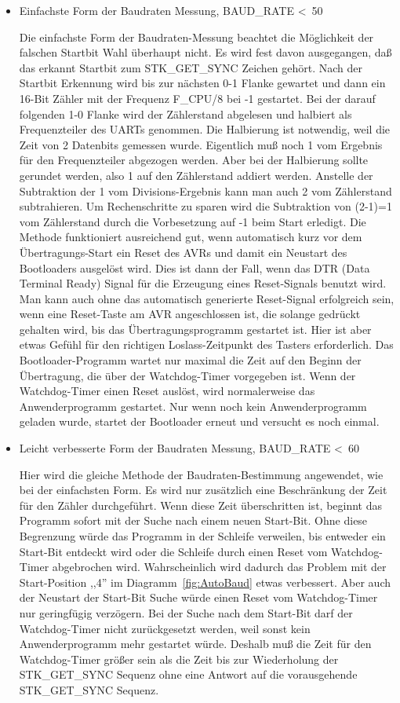 \begin{itemize}

\item {Einfachste Form der Baudraten Messung, BAUD\_RATE \textless~50}

Die einfachste Form der Baudraten-Messung beachtet die Möglichkeit der
falschen Startbit Wahl überhaupt nicht. Es wird fest davon ausgegangen,
daß das erkannt Startbit zum STK\_\-GET\_\-SYNC Zeichen gehört.
Nach der Startbit Erkennung wird bis zur nächsten 0-1 Flanke gewartet
und dann ein 16-Bit Zähler mit der Frequenz F\_CPU/8 bei -1 gestartet.
Bei der darauf folgenden 1-0 Flanke wird der Zählerstand abgelesen
und halbiert als Frequenzteiler des UARTs genommen.
Die Halbierung ist notwendig, weil die Zeit von 2 Datenbits gemessen wurde.
Eigentlich muß noch 1 vom Ergebnis für den Frequenzteiler abgezogen werden.
Aber bei der Halbierung sollte gerundet werden, also 1 auf den Zählerstand
addiert werden. Anstelle der Subtraktion der 1 vom Divisions-Ergebnis kann
man auch 2 vom Zählerstand subtrahieren. Um Rechenschritte zu sparen
wird die Subtraktion von (2-1)=1 vom Zählerstand durch die Vorbesetzung
auf -1 beim Start erledigt.
Die Methode funktioniert ausreichend gut,
wenn automatisch kurz vor dem Übertragungs-Start ein Reset des AVRs und damit
ein Neustart des Bootloaders ausgelöst wird. Dies ist dann der Fall,
wenn das DTR (Data Terminal Ready) Signal für die Erzeugung eines Reset-Signals
benutzt wird.
Man kann auch ohne das automatisch generierte Reset-Signal erfolgreich sein,
wenn eine Reset-Taste am AVR angeschlossen ist, die solange gedrückt gehalten
wird, bis das Übertragungsprogramm gestartet ist. Hier ist aber etwas
Gefühl für den richtigen Loslass-Zeitpunkt des Tasters erforderlich.
Das Bootloader-Programm wartet nur maximal die Zeit auf den Beginn der Übertragung,
die über der Watchdog-Timer vorgegeben ist.
Wenn der Watchdog-Timer einen Reset auslöst, wird normalerweise das Anwenderprogramm
gestartet. Nur wenn noch kein Anwenderprogramm geladen wurde,
startet der Bootloader erneut und versucht es noch einmal.

\item {Leicht verbesserte Form der Baudraten Messung, BAUD\_RATE \textless~60}

Hier wird die gleiche Methode der Baudraten-Bestimmung angewendet, wie bei
der einfachsten Form. Es wird nur zusätzlich eine Beschränkung der
Zeit für den Zähler durchgeführt.
Wenn diese Zeit überschritten ist, beginnt das Programm sofort mit der Suche
nach einem neuen Start-Bit. Ohne diese Begrenzung würde das Programm in der
Schleife verweilen, bis entweder ein Start-Bit entdeckt wird oder 
die Schleife durch einen Reset vom Watchdog-Timer abgebrochen wird.
Wahrscheinlich wird dadurch das Problem mit der Start-Position ,,4'' im
Diagramm~\ref{fig:AutoBaud} etwas verbessert.
Aber auch der Neustart der Start-Bit Suche würde einen Reset vom Watchdog-Timer
nur geringfügig verzögern. Bei der Suche nach dem Start-Bit darf der
Watchdog-Timer nicht zurückgesetzt werden, weil sonst kein Anwenderprogramm
mehr gestartet würde. Deshalb muß die Zeit für den Watchdog-Timer größer
sein als die Zeit bis zur Wiederholung der STK\_GET\_SYNC Sequenz
ohne eine Antwort auf die vorausgehende STK\_GET\_SYNC Sequenz.


\end{itemize}
